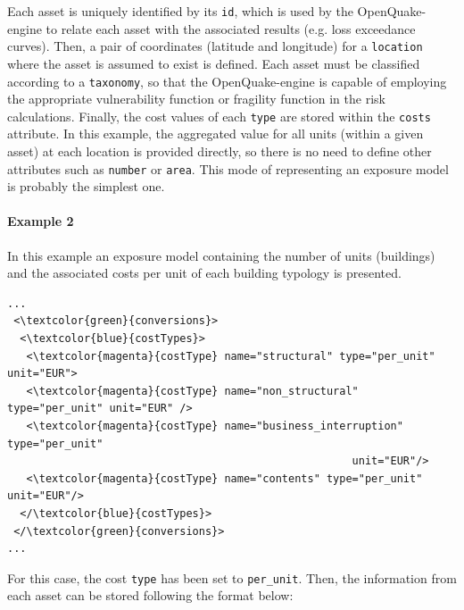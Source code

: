 Each \gls{asset} is uniquely identified by its \Verb+id+, which is used by the OpenQuake-engine to relate each asset with the associated results (e.g. loss exceedance curves). Then, a pair of coordinates (latitude and longitude) for a \Verb+location+ where the asset is assumed to exist is defined. Each asset must be classified according to a \Verb+taxonomy+, so that the OpenQuake-engine is capable of employing the appropriate \gls{vulnerability function} or \gls{fragility function} in the risk calculations. Finally, the cost values of each \Verb+type+ are stored within the \Verb+costs+ attribute. In this example, the aggregated value for all units (within a given asset) at each location is provided directly, so there is no need to define other attributes such as \Verb+number+ or \Verb+area+. This mode of representing an exposure model is probably the simplest one.

\paragraph{Example 2}
In this example an \gls{exposure model} containing the number of units (buildings) and the associated costs per unit of each building typology is presented.

\begin{Verbatim}[frame=single, commandchars=\\\{\}, samepage=false]
...
 <\textcolor{green}{conversions}>
  <\textcolor{blue}{costTypes}>
   <\textcolor{magenta}{costType} name="structural" type="per_unit" unit="EUR">
   <\textcolor{magenta}{costType} name="non_structural" type="per_unit" unit="EUR" />
   <\textcolor{magenta}{costType} name="business_interruption" type="per_unit" 
                                                      unit="EUR"/>
   <\textcolor{magenta}{costType} name="contents" type="per_unit" unit="EUR"/>
  </\textcolor{blue}{costTypes}>
 </\textcolor{green}{conversions}>
...
\end{Verbatim}

For this case, the cost \Verb+type+ has been set to \Verb+per_unit+. Then, the information from each asset can be stored following the format below:

